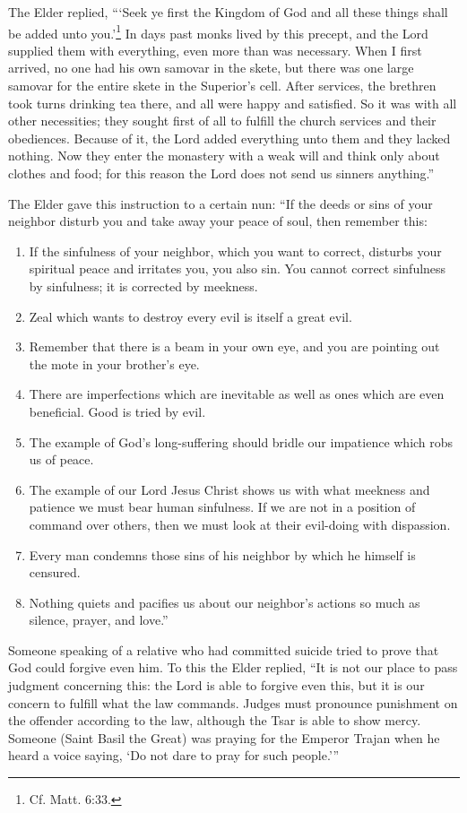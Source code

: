 The Elder replied, ```Seek ye first the Kingdom of God and all these things shall be added unto you.'\footnote{Cf. Matt. 6:33.} In days past monks lived by this precept, and the Lord supplied them with everything, even more than was necessary. When I first arrived, no one had his own samovar in the skete, but there was one large samovar for the entire skete in the Superior's cell. After services, the brethren took turns drinking tea there, and all were happy and satisfied. So it was with all other necessities; they sought first of all to fulfill the church services and their obediences. Because of it, the Lord added everything unto them and they lacked nothing. Now they enter the monastery with a weak will and think only about clothes and food; for this reason the Lord does not send us sinners anything.''

The Elder gave this instruction to a certain nun: ``If the deeds or sins of your neighbor disturb you and take away your peace of soul, then remember this:

\begin{enumerate}[label=\textit{\alph*}.]
\item If the sinfulness of your neighbor, which you want to correct, disturbs your spiritual peace and irritates you, you also sin. You cannot correct sinfulness by sinfulness; it is corrected by meekness. 
\item Zeal which wants to destroy every evil is itself a great evil.
\item Remember that there is a beam in your own eye, and you are pointing out the mote in your brother's eye.
\item There are imperfections which are inevitable as well as ones which are even beneficial. Good is tried by evil.
\item The example of God's long-suffering should bridle our impatience which robs us of peace.
\item The example of our Lord Jesus Christ shows us with what meekness and patience we must bear human sinfulness. If we are not in a position of command over others, then we must look at their evil-doing with dispassion.
\item Every man condemns those sins of his neighbor by which he himself is censured.
\item Nothing quiets and pacifies us about our neighbor's actions so much as silence, prayer, and love.''
\end{enumerate}

Someone speaking of a relative who had committed suicide tried to prove that God could forgive even him. To this the Elder replied, ``It is not our place to pass judgment concerning this: the Lord is able to forgive even this, but it is our concern to fulfill what the law commands. Judges must pronounce punishment on the offender according to the law, although the Tsar is able to show mercy. Someone (Saint Basil the Great) was praying for the Emperor Trajan when he heard a voice saying, `Do not dare to pray for such people.'''

